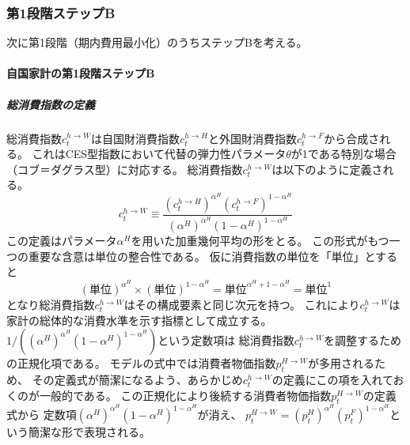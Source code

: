 \subsubsection{第1段階ステップB}
\label{sec:model_households_indices_aggregation_stage1b}

次に第1段階（期内費用最小化）のうちステップBを考える。

\paragraph{自国家計の第1段階ステップB}
\label{sec:model_households_indices_aggregation_stage1b_home}

\subparagraph{総消費指数の定義}
\label{sec:model_households_indices_aggregation_stage1b_home_c_h_W}
総消費指数\(c_t^{h\to W}\)は自国財消費指数\(c_t^{h\to H}\)と外国財消費指数\(c_t^{h\to F}\)から合成される。
これはCES型指数において代替の弾力性パラメータ\(\theta\)が1である特別な場合（コブ＝ダグラス型）に対応する。
総消費指数\(c_t^{h\to W}\)は以下のように定義される。
\begin{equation}
\label{form:model_households_indices_aggregation_stage1b_home_c_h_W_def}
    c_t^{h\to W}\equiv\frac{(c_t^{h\to H})^{\alpha^H}(c_t^{h\to F})^{1-\alpha^H}}{(\alpha^H)^{\alpha^H}(1-\alpha^H)^{1-\alpha^H}}
\end{equation}
この定義はパラメータ\(\alpha^H\)を用いた加重幾何平均の形をとる。
この形式がもつ一つの重要な含意は単位の整合性である。
仮に消費指数の単位を「単位」とすると
\begin{equation}
\label{form:model_households_indices_aggregation_stage1b_home_c_h_W_unit_id}
    (\text{単位})^{\alpha^H}\times(\text{単位})^{1-\alpha^H}=\text{単位}^{\alpha^H+1-\alpha^H}=\text{単位}^1
\end{equation}
となり総消費指数\(c_t^{h\to W}\)はその構成要素と同じ次元を持つ。
これにより\(c_t^{h\to W}\)は家計の総体的な消費水準を示す指標として成立する。
\(1/\left((\alpha^H)^{\alpha^H}(1-\alpha^H)^{1-\alpha^H}\right)\)という定数項は
総消費指数\(c_t^{h\to W}\)を調整するための正規化項である。
モデルの式中では消費者物価指数\(p_t^{H\to W}\)が多用されるため、
その定義式が簡潔になるよう、あらかじめ\(c_t^{h\to W}\)の定義にこの項を入れておくのが一般的である。
この正規化により後続する消費者物価指数\(p_t^{H\to W}\)の定義式から
定数項\((\alpha^H)^{\alpha^H}(1-\alpha^H)^{1-\alpha^H}\)が消え、
\(p_t^{H\to W}=(p_t^H)^{\alpha^H}(p_t^F)^{1-\alpha^H}\)という簡潔な形で表現される。

